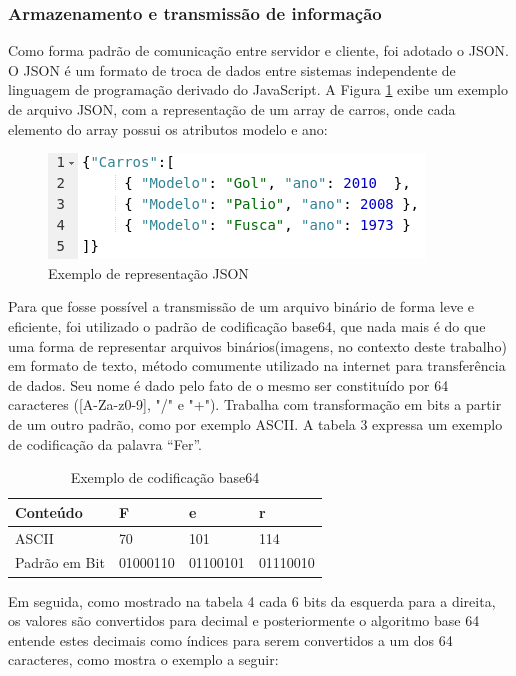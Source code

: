 \documentclass[12pt]{article}
\begin{document}
\subsubsection{Armazenamento e transmissão de informação}

Como forma padrão de comunicação entre servidor e cliente, foi adotado o JSON. O JSON é um formato de troca de dados entre sistemas independente de linguagem de programação derivado do JavaScript. A Figura \ref{fig:Figura4} exibe um exemplo de arquivo JSON, com a representação de um array de carros, onde cada elemento do array possui os atributos modelo e ano:

\begin{figure}[ht]
	\centering
	\includegraphics[width=.7\textwidth]{exemplo-json.png}
	\caption{Exemplo de representação JSON}
	\label{fig:Figura4}
\end{figure}

Para que fosse possível a transmissão de um arquivo binário de forma leve e eficiente, foi utilizado o padrão de codificação base64, que nada mais é do que uma forma de representar arquivos binários(imagens, no contexto deste trabalho) em formato de texto, método comumente utilizado na internet para transferência de dados.
Seu nome é dado pelo fato de o mesmo ser constituído por 64 caracteres ([A-Za-z0-9], "/" e "+"). Trabalha com transformação em bits a partir de um outro padrão, como por exemplo ASCII. A tabela 3 expressa um exemplo de codificação da palavra “Fer”.

\begin{table}[ht]
	\centering
	\caption{Exemplo de codificação base64}
	\label{tab:Table3}
	\smallskip
	\begin{tabular}{ |l|l|l|l| }
		\hline
		Conteúdo & F & e & r \\ \hline
		ASCII & 70 & 101 & 114 \\ \hline
		Padrão em Bit & 01000110 & 01100101 & 01110010\\ \hline
	\end{tabular}
\end{table}

Em seguida, como mostrado na tabela 4 cada 6 bits da esquerda para a direita, os valores são convertidos para decimal e posteriormente o algoritmo base 64 entende estes decimais como índices para serem convertidos a um dos 64 caracteres, como mostra o exemplo a seguir:
\end{document}
